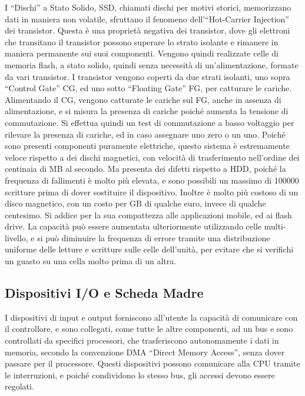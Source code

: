 \documentclass{article}
\numberwithin{equation}{subsection}
\begin{document}
I ``Dischi'' a Stato Solido, SSD, chiamati dischi per motivi storici, memorizzano dati in maniera non volatile, sfruttano il fenomeno dell'``Hot-Carrier Injection'' dei transistor. Questa è una proprietà 
negativa dei transistor, dove gli elettroni che transitano il transistor possono superare lo strato isolante e rimanere in maniera permanente sui suoi componenti. 
Vengono quindi realizzate celle di memoria flash, a stato solido, quindi senza necessità di un'alimentazione, formate da vari transistor. 
I transistor vengono coperti da due strati isolanti, uno sopra ``Control Gate'' CG, ed uno sotto ``Floating Gate'' FG, per catturare le cariche. Alimentando il CG, vengono catturate le cariche sul FG, anche in assenza 
di alimentazione, e si misura la presenza di cariche poiché aumenta la tensione di commutazione. Si effettua quindi un test di commutazione a basso voltaggio per rilevare la presenza di cariche, ed in caso 
assegnare uno zero o un uno. 
Poiché sono presenti componenti puramente elettriche, questo sistema è estremamente veloce rispetto a dei dischi magnetici, con velocità di trasferimento nell'ordine dei centinaia di MB al secondo. Ma presenta dei 
difetti rispetto a HDD, poiché la frequenza di fallimenti è molto più elevata, e sono possibili un massimo di 100000 scritture prima di dover sostituire il dispositivo. 
Inoltre è molto più costoso di un disco magnetico, con un costo per GB di qualche euro, invece di qualche centesimo. Si addice per la sua compattezza alle applicazioni mobile, ed ai flash drive. La capacità può 
essere aumentata ulteriormente utilizzando celle multi-livello, e si può diminuire la frequenza di errore tramite una distribuzione uniforme delle letture e scritture sulle celle dell'unità, per evitare che si 
verifichi un guasto su una cella molto prima di un altra. 

\subsection{Dispositivi I/O e Scheda Madre}

I dispositivi di input e output forniscono all'utente la capacità di comunicare con il controllore, e sono collegati, come tutte le altre componenti, ad un bus e sono controllati da specifici processori, che 
trasferiscono autonomamente i dati in memoria, secondo la convenzione DMA ``Direct Memory Access'', senza dover passare per il processore. Questi dispositivi possono comunicare alla CPU tramite le interruzioni, e 
poiché condividono lo stesso bus, gli accessi devono essere regolati. 
\end{document}
